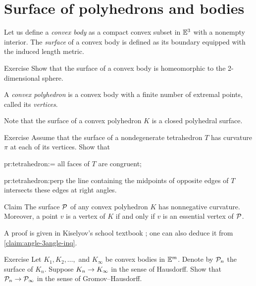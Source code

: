 \section{Surface of polyhedrons and bodies}

Let us define a \emph{convex body} as a compact convex subset in $\mathbb{E}^3$ with a nonempty interior.
The \emph{surface} of a convex body is defined as its boundary equipped with the induced length metric.

\begin{thm}{Exercise}\label{ex:surf-S2}
Show that the surface of a convex body is homeomorphic to the 2-dimensional sphere.
\end{thm}

A \emph{convex polyhedron} is a convex body with a finite number of extremal points, called its \emph{vertices}.

Note that the surface of a convex polyhedron $K$ is a closed polyhedral surface.

\begin{thm}{Exercise}\label{pr:tetrahedron}
Assume that the surface of a nondegenerate tetrahedron $T$ has curvature $\pi$ at each of its vertices.
Show that

\begin{subthm}{pr:tetrahedron:=}
all faces of $T$ are congruent;
\end{subthm}

\begin{subthm}{pr:tetrahedron:perp} the line containing the midpoints of opposite edges of $T$ intersects these edges at right angles.
\end{subthm}

\end{thm}

\begin{thm}{Claim}\label{clm:total-angle}
The surface $\mathcal{P}$ of any convex polyhedron $K$ has nonnegative curvature.
Moreover, a point $v$ is a vertex of $K$ if and only if
$v$ is an essential vertex of $\mathcal{P}$.
\end{thm}

A proof is given in Kiselyov's school textbook \cite[§ 48]{kiselev-stereo-en};
one can also deduce it from \ref{claim:angle-3angle-inq}.

\begin{thm}{Exercise}\label{ex:surface-covergence}
Let $K_1,K_2,\dots,$ and $K_\infty$ be convex bodies in $\mathbb{E}^m$.
Denote by $\mathcal{P}_n$ the surface of $K_n$.
Suppose $K_n\to K_\infty$ in the sense of Hausdorff.
Show that $\mathcal{P}_n\to \mathcal{P}_\infty$ in the sense of Gromov--Hausdorff.
\end{thm}

